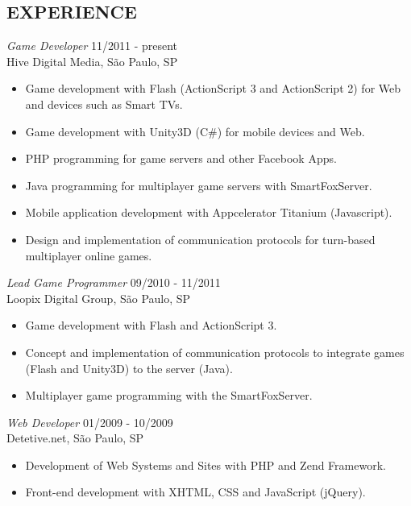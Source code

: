 \documentclass[line,margin]{res}
\begin{document}
\begin{resume}
\section{EXPERIENCE} {\sl Game Developer} \hfill 11/2011 - present \\
                Hive Digital Media, São Paulo, SP
                 \begin{itemize}  \itemsep -3pt
                 \item Game development with Flash (ActionScript 3 and ActionScript 2) for Web and devices such as Smart TVs.
		 \item Game development with Unity3D (C\#) for mobile devices and Web.
                 \item PHP programming for game servers and other Facebook Apps.
                 \item Java programming for multiplayer game servers with SmartFoxServer.
		 \item Mobile application development with Appcelerator Titanium (Javascript).
                 \item Design and implementation of communication protocols for turn-based multiplayer online games.
                 \end{itemize}
                 
                 {\sl Lead Game Programmer} \hfill 09/2010 - 11/2011 \\
                Loopix Digital Group, São Paulo, SP
                 \begin{itemize}  \itemsep -3pt
                 \item Game development with Flash and ActionScript 3.
                 \item Concept and implementation of communication protocols to integrate games (Flash and Unity3D) to the server (Java).
                 \item Multiplayer game programming with the SmartFoxServer.
                 \end{itemize}
 
                {\sl Web Developer} \hfill 01/2009 - 10/2009 \\
                Detetive.net, São Paulo, SP
                 \begin{itemize}  \itemsep -3pt
                 \item Development of Web Systems and Sites with PHP and Zend Framework.
                 \item Front-end development with XHTML, CSS and JavaScript (jQuery).
                 \end{itemize} 


\end{resume}
\end{document}
